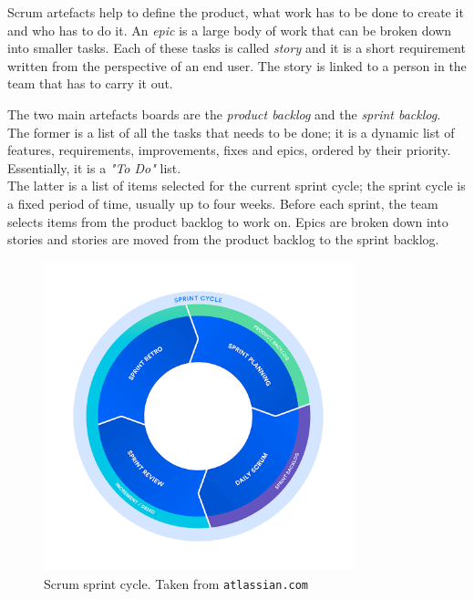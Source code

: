 Scrum artefacts help to define the product, what work has to be done to create it and who has to do it. An \textit{epic} is a large body of work that can be broken down into smaller tasks. Each of these tasks is called \textit{story} and it is a short requirement written from the perspective of an end user. The story is linked to a person in the team that has to carry it out.

The two main artefacts boards are the \textit{product backlog} and the \textit{sprint backlog}. \\
The former is a list of all the tasks that needs to be done; it is a dynamic list of features, requirements, improvements, fixes and epics, ordered by their priority. Essentially, it is a \textit{"To Do"} list.\\
The latter is a list of items selected for the current sprint cycle; the sprint cycle is a fixed period of time, usually up to four weeks. Before each sprint, the team selects items from the product backlog to work on. Epics are broken down into stories and stories are moved from the product backlog to the sprint backlog.~\cite{scrum-epic-stories}

\begin{figure}[ht]
  \centering
  \includegraphics[width=0.8\textwidth]{chapters/02/assets/scrum}
  \caption{Scrum sprint cycle. Taken from \texttt{atlassian.com}}
  \label{fig:scrum-sprint-cycle}
\end{figure}

